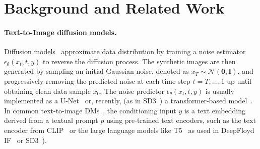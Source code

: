 \section{Background and Related Work}
\label{sec:related}






\paragraph{Text-to-Image diffusion models.}
Diffusion models~\citep{song2020,ho2020} approximate data distribution by training a noise estimator $\epsilon_\theta(x_t, t, y)$ to reverse the diffusion process. The synthetic images are then generated by sampling an initial Gaussian noise, denoted as $x_T \sim \mathcal{N}(\mathbf{0}, \mathbf{I})$, and progressively removing the predicted noise at each time step $t = T, \ldots, 1$ up until obtaining clean data sample $x_0$.
The noise predictor $\epsilon_\theta(x_t, t, y)$ is usually implemented as a U-Net~\citep{ronneberger2015unet} or, recently, (as in SD3~\cite{esser2024scalingSD3}) a transformer-based model~\citep{vaswani2017attention,peebles2023scalable}.
In common text-to-image DMs~\citep{dalle_2,rombach2022high,saharia2022imagen,DeepFloydIF}, the conditioning input $y$ is a text embedding derived from a textual prompt $p$ using pre-trained text encoders, such as the text encoder from CLIP~\citep{clip} or the large language models like T5~\citep{raffel2020exploringT5}
as used in DeepFloyd IF~\citep{DeepFloydIF} or SD3~\citep{esser2024scalingSD3}).

